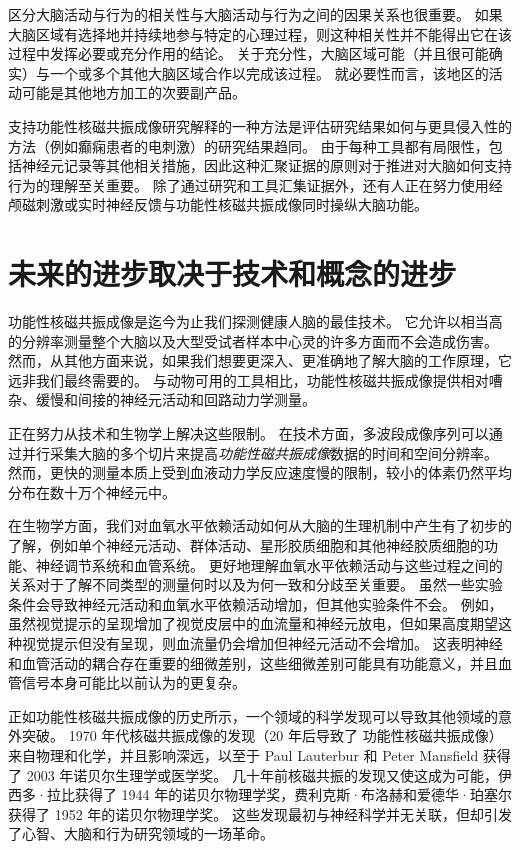 区分大脑活动与行为的相关性与大脑活动与行为之间的因果关系也很重要。
如果大脑区域有选择地并持续地参与特定的心理过程，则这种相关性并不能得出它在该过程中发挥必要或充分作用的结论。
关于充分性，大脑区域可能（并且很可能确实）与一个或多个其他大脑区域合作以完成该过程。
就必要性而言，该地区的活动可能是其他地方加工的次要副产品。


支持功能性核磁共振成像研究解释的一种方法是评估研究结果如何与更具侵入性的方法（例如癫痫患者的电刺激）的研究结果趋同。
由于每种工具都有局限性，包括神经元记录等其他相关措施，因此这种汇聚证据的原则对于推进对大脑如何支持行为的理解至关重要。
除了通过研究和工具汇集证据外，还有人正在努力使用经颅磁刺激或实时神经反馈与功能性核磁共振成像同时操纵大脑功能。




\section{未来的进步取决于技术和概念的进步}

功能性核磁共振成像是迄今为止我们探测健康人脑的最佳技术。
它允许以相当高的分辨率测量整个大脑以及大型受试者样本中心灵的许多方面而不会造成伤害。
然而，从其他方面来说，如果我们想要更深入、更准确地了解大脑的工作原理，它远非我们最终需要的。
与动物可用的工具相比，功能性核磁共振成像提供相对嘈杂、缓慢和间接的神经元活动和回路动力学测量。


正在努力从技术和生物学上解决这些限制。
在技术方面，多波段成像序列可以通过并行采集大脑的多个切片来提高\textit{功能性磁共振成像}数据的时间和空间分辨率。
然而，更快的测量本质上受到血液动力学反应速度慢的限制，较小的体素仍然平均分布在数十万个神经元中。


在生物学方面，我们对血氧水平依赖活动如何从大脑的生理机制中产生有了初步的了解，例如单个神经元活动、群体活动、星形胶质细胞和其他神经胶质细胞的功能、神经调节系统和血管系统。
更好地理解血氧水平依赖活动与这些过程之间的关系对于了解不同类型的测量何时以及为何一致和分歧至关重要。 
虽然一些实验条件会导致神经元活动和血氧水平依赖活动增加，但其他实验条件不会。
例如，虽然视觉提示的呈现增加了视觉皮层中的血流量和神经元放电，但如果高度期望这种视觉提示但没有呈现，则血流量仍会增加但神经元活动不会增加。
这表明神经和血管活动的耦合存在重要的细微差别，这些细微差别可能具有功能意义，并且血管信号本身可能比以前认为的更复杂。


正如功能性核磁共振成像的历史所示，一个领域的科学发现可以导致其他领域的意外突破。
1970 年代核磁共振成像的发现（20 年后导致了 功能性核磁共振成像）来自物理和化学，并且影响深远，以至于 Paul Lauterbur 和 Peter Mansfield 获得了 2003 年诺贝尔生理学或医学奖。
几十年前核磁共振的发现又使这成为可能，伊西多·拉比获得了 1944 年的诺贝尔物理学奖，费利克斯·布洛赫和爱德华·珀塞尔获得了 1952 年的诺贝尔物理学奖。 
这些发现最初与神经科学并无关联，但却引发了心智、大脑和行为研究领域的一场革命。


